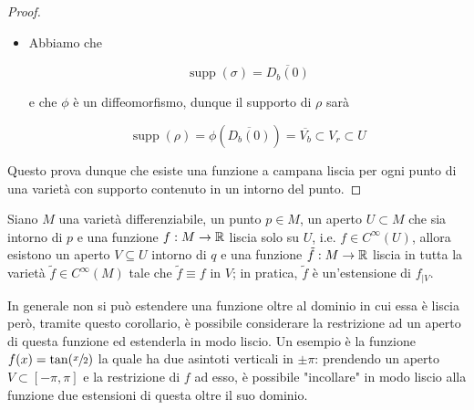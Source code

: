 \begin{proof}
\begin{itemize}
		\item Abbiamo che
		
		\begin{equation}
			\operatorname{supp}(\sigma) = \overline{D_{b}(0)}
		\end{equation}
	
		e che $ \phi $ è un diffeomorfismo, dunque il supporto di $ \rho $ sarà
		
		\begin{equation}
			\operatorname{supp}(\rho) = \phi \left( \overline{D_{b}(0)} \right) = \overline{V_{b}} \subset V_{r} \subset U
		\end{equation}
	\end{itemize}
	
	Questo prova dunque che esiste una funzione a campana liscia per ogni punto di una varietà con supporto contenuto in un intorno del punto.
\end{proof}

\begin{corollary}\label{cor-est-smooth}
	Siano $ M $ una varietà differenziabile, un punto $ p \in M $, un aperto $ U \subset M $ che sia intorno di $ p $ e una funzione $ f : M \to \mathbb{R} $ liscia solo su $ U $, i.e. $ f \in C^{\infty}(U) $, allora esistono un aperto $ V \subseteq U $ intorno di $ q $ e una funzione $ \tilde{f} : M \to \mathbb{R} $ liscia in tutta la varietà $ \tilde{f} \in C^{\infty}(M) $ tale che $ \tilde{f} \equiv f $ in $ V $; in pratica, $ \tilde{f} $ è un'estensione di $ f_{|V} $.
\end{corollary}

In generale non si può estendere una funzione oltre al dominio in cui essa è liscia però, tramite questo corollario, è possibile considerare la restrizione ad un aperto di questa funzione ed estenderla in modo liscio. Un esempio è la funzione $ f(x) = \tan(\sfrac{x}{2}) $ la quale ha due asintoti verticali in $ \pm \pi $: prendendo un aperto $ V \subset [-\pi,\pi] $ e la restrizione di $ f $ ad esso, è possibile "incollare" in modo liscio alla funzione due estensioni di questa oltre il suo dominio.

